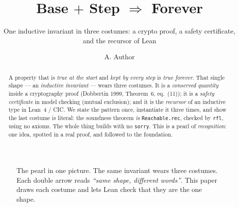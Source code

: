 \documentclass[runningheads]{llncs}
\title{Base $+$ Step $\Rightarrow$ Forever}
\subtitle{One inductive invariant in three costumes: a crypto proof,
          a safety certificate, and the recursor of \textsf{Lean}}
\author{A. Author\inst{1}}
\institute{Somewhere University, \email{a.author@example.edu}}
\begin{document}
\maketitle

\begin{abstract}
A property that is \emph{true at the start} and \emph{kept by every step} is
\emph{true forever}. That single shape --- an \emph{inductive invariant} ---
wears three costumes. It is a \emph{conserved quantity} inside a cryptography
proof (Dobbertin 1999, Theorem~6, eq.~(11)); it is a \emph{safety certificate}
in model checking (mutual exclusion); and it is the \emph{recursor} of an
inductive type in Lean~4 / CIC. We state the pattern once, instantiate it three
times, and show the last costume is literal: the soundness theorem \emph{is}
\lstinline[style=lean]|Reachable.rec|, checked by \lstinline[style=lean]|rfl|,
using no axioms. The whole thing builds with no \lstinline[style=lean]|sorry|.
This is a pearl of \emph{recognition}: one idea, spotted in a real proof, and
followed to the foundation.
\end{abstract}

\begin{figure}[H]
\centering
{}
\caption{The pearl in one picture. The same invariant wears three costumes.
Each double arrow reads \emph{``same shape, different words''}. This paper draws
each costume and lets Lean check that they are the one shape.}
\label{fig:overview}
\end{figure}
\end{document}
